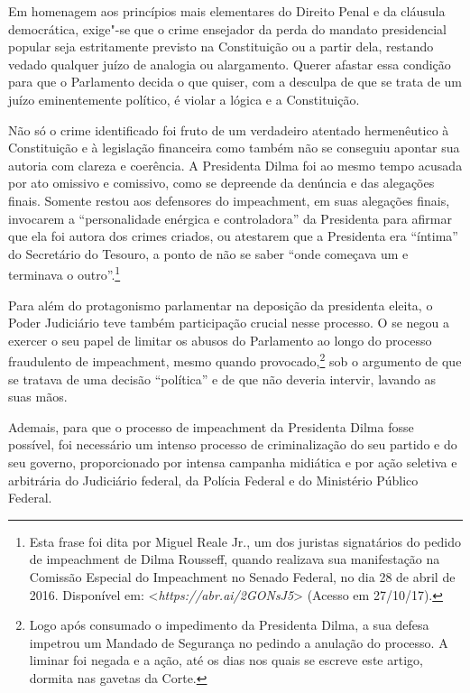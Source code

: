 Em homenagem aos princípios mais elementares do Direito Penal e da
cláusula democrática, exige"-se que o crime ensejador da perda do mandato
presidencial popular seja estritamente previsto na Constituição ou a
partir dela, restando vedado qualquer juízo de analogia ou alargamento.
Querer afastar essa condição para que o Parlamento decida o que quiser,
com a desculpa de que se trata de um juízo eminentemente político, é
violar a lógica e a Constituição.

Não só o crime identificado foi fruto de um verdadeiro atentado
hermenêutico à Constituição e à legislação financeira como também não se
conseguiu apontar sua autoria com clareza e coerência. A Presidenta
Dilma foi ao mesmo tempo acusada por ato omissivo e comissivo, como se
depreende da denúncia e das alegações finais. Somente restou aos
defensores do impeachment, em suas alegações finais, invocarem a
``personalidade enérgica e controladora'' da Presidenta para afirmar que
ela foi autora dos crimes criados, ou atestarem que a Presidenta era
``íntima'' do Secretário do Tesouro, a ponto de não se saber ``onde
começava um e terminava o outro''.\footnote{Esta frase foi dita por Miguel
  Reale Jr., um dos juristas signatários do pedido de impeachment de
  Dilma Rousseff, quando realizava sua manifestação na Comissão Especial
  do Impeachment no Senado Federal, no dia 28 de abril de 2016.
  Disponível em:
  \textless{}\emph{https://abr.ai/2GONsJ5}\textgreater{}
  (Acesso em 27/10/17).}

Para além do protagonismo parlamentar na deposição da presidenta eleita,
o Poder Judiciário teve também participação crucial nesse processo. O
 se negou a exercer o seu papel de limitar os abusos do Parlamento ao
longo do processo fraudulento de impeachment, mesmo quando
provocado,\footnote{Logo após consumado o impedimento da Presidenta
  Dilma, a sua defesa impetrou um Mandado de Segurança no  pedindo a
  anulação do processo. A liminar foi negada e a ação, até os dias
  nos quais se escreve este artigo, dormita nas gavetas da Corte.} sob
o argumento de que se tratava de uma decisão ``política'' e de que não
deveria intervir, lavando as suas mãos.

Ademais, para que o processo de impeachment da Presidenta Dilma fosse
possível, foi necessário um intenso processo de criminalização do seu
partido e do seu governo, proporcionado por intensa campanha midiática e
por ação seletiva e arbitrária do Judiciário federal, da Polícia Federal
e do Ministério Público Federal.

